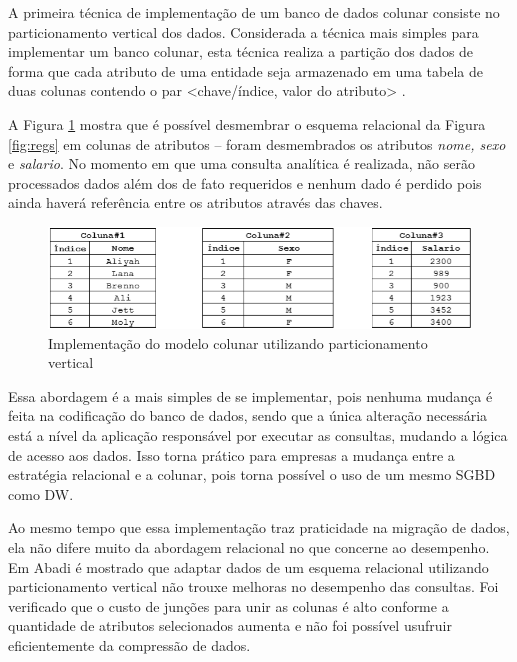 A primeira técnica de implementação de um banco de dados colunar consiste no particionamento vertical dos dados. Considerada a técnica mais simples para implementar um banco colunar, esta técnica 
realiza a partição dos dados de forma que cada atributo de uma entidade seja armazenado 
em uma tabela de duas colunas contendo o par <chave/índice, valor do atributo> \cite{khoshafian1987query}.


A Figura \ref{fig:vertical} mostra que é possível desmembrar o esquema relacional da Figura \ref{fig:regs} em colunas de atributos -- foram desmembrados os atributos \textit{nome, sexo} e \textit{salario}. 
No momento em que uma consulta analítica é realizada, não serão processados dados além 
dos de fato requeridos e nenhum dado é perdido pois ainda haverá referência entre os atributos 
através das chaves.

\begin{figure}[htpb]
	\centering
        \includegraphics[width=\textwidth]{vertical}
	\caption{Implementação do modelo colunar utilizando particionamento vertical}
	\label{fig:vertical}
\end{figure}

Essa abordagem é a mais simples de se implementar, pois nenhuma mudança é feita 
na codificação do banco de dados, sendo que a única alteração necessária está a nível 
da aplicação responsável por executar as consultas, mudando a lógica de acesso aos dados. Isso torna prático para empresas a 
mudança entre a estratégia relacional e a colunar, pois torna possível o uso de um mesmo 
SGBD como DW.

Ao mesmo tempo que essa implementação traz praticidade na migração de dados, ela não difere 
muito da abordagem relacional no que concerne ao desempenho. Em Abadi \cite{abadi2008query} 
é mostrado que adaptar dados de um esquema relacional utilizando particionamento vertical não 
trouxe melhoras no desempenho das consultas. Foi verificado que o custo de junções para unir 
as colunas é alto conforme a quantidade de atributos selecionados aumenta e não foi possível 
usufruir eficientemente da compressão de dados.

